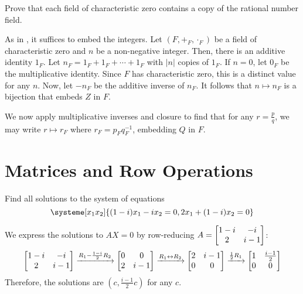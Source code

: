 \documentclass[notes]{agony}
\begin{document}
\begin{xca}
  Prove that each field of characteristic zero contains a copy of the rational number field.
\end{xca}
\begin{prf}
  As in , it suffices to embed the integers.
  Let $(F, +_F, \cdot_F)$ be a field of characteristic zero and $n$ be a non-negative integer.
  Then, there is an additive identity $1_F$.
  Let $n_F = 1_F + 1_F + \dotsb + 1_F$ with $|n|$ copies of $1_F$.
  If $n = 0$, let $0_F$ be the multiplicative identity.
  Since $F$ has characteristic zero, this is a distinct value for any $n$.
  Now, let $-n_F$ be the additive inverse of $n_F$.
  It follows that $n \mapsto n_F$ is a bijection that embeds $Z$ in $F$.

  We now apply multiplicative inverses and closure to find that for any $r = \frac{p}{q}$,
  we may write $r \mapsto r_F$ where $r_F = p_F q_F^{-1}$, embedding $Q$ in $F$.
\end{prf}

\section{Matrices and Row Operations}

\begin{xca}
  Find all solutions to the system of equations
  \[ \systeme[x_1x_2]{{(1-i)}x_1 - ix_2 = 0, 2x_1 + {(1-i)}x_2 = 0} \]
\end{xca}
\begin{sol}
  We express the solutions to $AX = 0$ by row-reducing $A = \mqty[1-i&-i\\2&i-1]$:
  \[
    \mqty[1-i&-i\\2&i-1]
    \xto{R_1 - \frac{1-i}{2}R_2} \mqty[0&0\\2&i-1]
    \xto{R_1 \harr R_2} \mqty[2&i-1\\0&0]
    \xto{\frac12 R_1} \mqty[1&\frac{i-1}{2}\\0&0]
  \]
  Therefore, the solutions are $(c, \frac{i-1}{2}c)$ for any $c$.
\end{sol}
\end{document}
